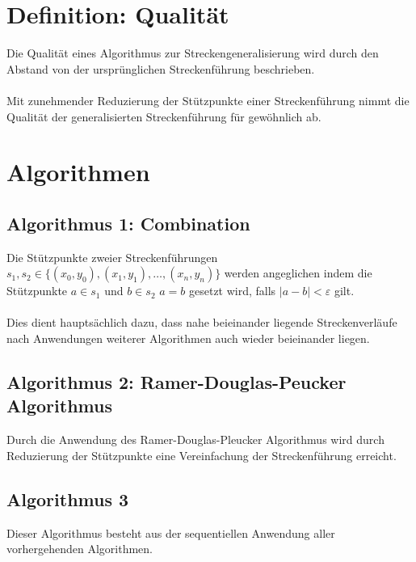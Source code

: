 \documentclass[twoside]{scrartcl}
\begin{document}
\section{Definition: Qualität}
Die Qualität eines Algorithmus zur Streckengeneralisierung
wird durch den Abstand von der ursprünglichen Streckenführung
beschrieben.\\\\
Mit zunehmender Reduzierung der Stützpunkte einer Streckenführung
nimmt die Qualität der generalisierten Streckenführung für
gewöhnlich ab.
\section{Algorithmen}
\subsection{Algorithmus 1: Combination}
Die Stützpunkte zweier Streckenführungen
$s_1, s_2 \in \{(x_0, y_0), (x_1, y_1), \ldots, (x_n, y_n)\}$
werden angeglichen indem die Stützpunkte
$a \in s_1$ und  $b \in s_2$ $a = b$ gesetzt wird, falls
$|a - b| < \varepsilon$ gilt.\\
\\
Dies dient hauptsächlich dazu, dass nahe beieinander liegende
Streckenverläufe nach Anwendungen weiterer Algorithmen auch
wieder beieinander liegen.
\subsection{Algorithmus 2: Ramer-Douglas-Peucker Algorithmus}
Durch die Anwendung des Ramer-Douglas-Pleucker Algorithmus
wird durch Reduzierung der Stützpunkte eine Vereinfachung
der Streckenführung erreicht.

\subsection{Algorithmus 3}
Dieser Algorithmus besteht aus der sequentiellen Anwendung aller
vorhergehenden Algorithmen.
\end{document}
